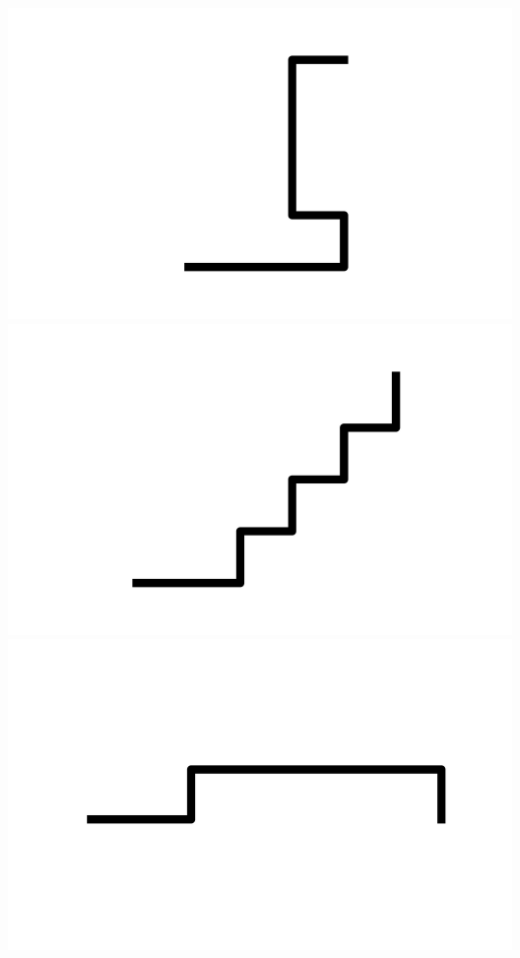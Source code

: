 \documentclass[]{report}
\begin{document}
\includegraphics[scale=.1]{pictures/21/state_cluster_shapes_259.pdf} 
\includegraphics[scale=.1]{pictures/21/state_cluster_shapes_260.pdf} 
\includegraphics[scale=.1]{pictures/21/state_cluster_shapes_261.pdf} 
\end{document}
